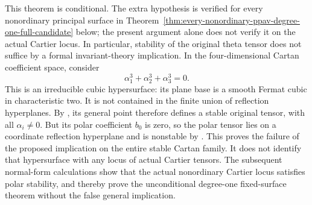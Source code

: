 \begin{remark}
\label{rem:nonordinary-polar-stability-gap-candidate}
This theorem is conditional. The extra hypothesis is verified for every
nonordinary principal surface in
Theorem~\ref{thm:every-nonordinary-ppav-degree-one-full-candidate} below;
the present argument alone does not verify it on the actual Cartier locus. In particular, stability of the original theta tensor does
not suffice by a formal invariant-theory implication.
In the four-dimensional Cartan coefficient space, consider
\[
                    \alpha_1^3+\alpha_2^3+\alpha_3^3=0.
\]
This is an irreducible cubic hypersurface: its plane base is a smooth
Fermat cubic in characteristic two. It is not contained in the finite
union of reflection hyperplanes. By
\citet[Proposition~2.10]{RainsSam2018Trivectors}, its general point
therefore defines a stable original tensor, with all $\alpha_i\ne0$.
But its polar coefficient $b_0$ is zero, so the polar tensor lies on
a coordinate reflection hyperplane and is nonstable by
\citet[Proposition~2.9]{RainsSam2018Trivectors}.
This proves the failure of the proposed implication on the entire
stable Cartan family. It does not identify that hypersurface with
any locus of actual Cartier tensors. The subsequent normal-form
calculations show that the actual nonordinary Cartier locus satisfies
polar stability, and thereby prove the unconditional degree-one
fixed-surface theorem without the false general implication.
\end{remark}
